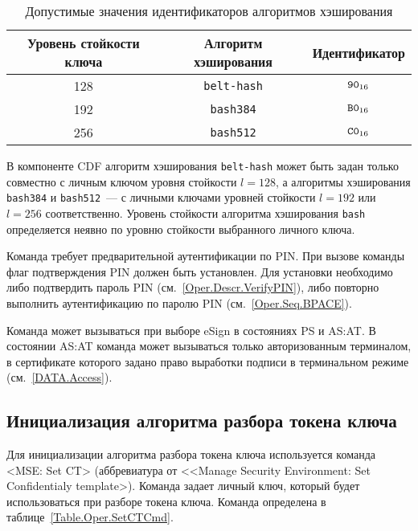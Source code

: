 
\begin{table}[hbt]
\caption{Допустимые значения идентификаторов алгоритмов хэширования}
\label{Table.Oper.AlgRef}
\begin{tabular}{|c|c|c|}
\hline
Уровень стойкости ключа & Алгоритм хэширования  & Идентификатор  \\
\hline
\hline
128 & \texttt{belt-hash} & $\texttt{90}_{16}$ \\
192 & \texttt{bash384} & $\texttt{B0}_{16}$ \\
256 & \texttt{bash512} & $\texttt{C0}_{16}$ \\
\hline
\end{tabular}
\end{table}

\fi


В компоненте CDF алгоритм хэширования \texttt{belt-hash}
может быть задан только совместно с личным ключом 
уровня стойкости $l=128$,
а алгоритмы хэширования \texttt{bash384} и \texttt{bash512}~--- 
с личными ключами уровней стойкости $l=192$ или $l=256$
соответственно.
Уровень стойкости алгоритма хэширования \texttt{bash} определяется 
неявно по уровню стойкости выбранного личного ключа.

Команда требует предварительной аутентификации по PIN. 
При вызове команды флаг подтверждения PIN должен быть установлен.
Для установки  необходимо либо подтвердить пароль PIN 
(см.~\ref{Oper.Descr.VerifyPIN}), либо повторно выполнить аутентификацию по 
паролю PIN (см.~\ref{Oper.Seq.BPACE}). 

Команда может вызываться при выборе eSign в состояниях PS и AS:AT. В состоянии 
AS:AT команда может вызываться только авторизованным терминалом,
в сертификате которого задано право выработки подписи в терминальном режиме 
(см.~\ref{DATA.Access}). 

\subsection{Инициализация алгоритма разбора токена ключа}
\label{Oper.Descr.SetCT}

Для инициализации алгоритма разбора токена ключа
используется команда <MSE: Set CT> 
(аббревиатура от <<Manage Security Environment: Set Confidentialy template>).
Команда задает личный ключ, который будет использоваться при разборе токена 
ключа. Команда определена в таблице~\ref{Table.Oper.SetCTCmd}.

